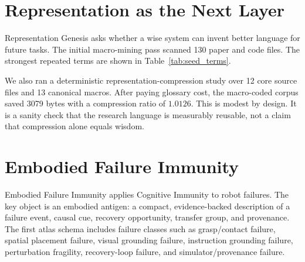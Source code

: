 \documentclass[11pt]{article}
\begin{document}
\begin{table}[t]
\centering
\scriptsize
\caption{Machine-generated claim registry excerpt.}
\label{tab:claim_registry}

\end{table}

\section{Representation as the Next Layer}

Representation Genesis asks whether a wise system can invent better language for future tasks.
The initial macro-mining pass scanned 130 paper and code files.
The strongest repeated terms are shown in Table~\ref{tab:seed_terms}.

\begin{table}[t]
\centering
\small
\caption{Top seed terms in the Wisdom Science corpus.}
\label{tab:seed_terms}

\end{table}

We also ran a deterministic representation-compression study over 12 core source files and 13 canonical macros.
After paying glossary cost, the macro-coded corpus saved 3079 bytes with a compression ratio of $1.0126$.
This is modest by design.
It is a sanity check that the research language is measurably reusable, not a claim that compression alone equals wisdom.

\section{Embodied Failure Immunity}

Embodied Failure Immunity applies Cognitive Immunity to robot failures.
The key object is an embodied antigen: a compact, evidence-backed description of a failure event, causal cue, recovery opportunity, transfer group, and provenance.
The first atlas schema includes failure classes such as grasp/contact failure, spatial placement failure, visual grounding failure, instruction grounding failure, perturbation fragility, recovery-loop failure, and simulator/provenance failure.

\begin{table}[t]
\centering
\small
\caption{Initial embodied failure atlas classes.}
\label{tab:failure_classes}

\end{table}
\end{document}
